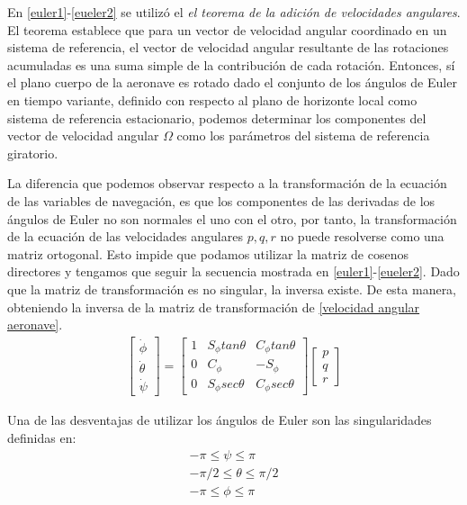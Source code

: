 En \ref{euler1}-\ref{eueler2} se utilizó el \textit{el teorema de la adición de velocidades angulares}. El teorema establece que para un vector de velocidad angular coordinado en un sistema de referencia, el vector de velocidad angular resultante de las rotaciones acumuladas es una suma simple de la contribución de cada rotación. Entonces, sí el plano cuerpo de la aeronave es rotado dado el conjunto de los ángulos de Euler en tiempo variante, definido con respecto al plano de horizonte local como sistema de referencia estacionario, podemos determinar los componentes del vector de velocidad angular $\Omega$ como los parámetros del sistema de referencia giratorio.

La diferencia que podemos observar respecto a la transformación de la ecuación de las variables de navegación, es que los componentes de las derivadas de los ángulos de Euler no son normales el uno con el otro, por tanto, la transformación de la ecuación de las velocidades angulares $p,q,r$ no puede resolverse como una matriz ortogonal. Esto impide que podamos utilizar la matriz de cosenos directores y tengamos que seguir la secuencia mostrada en \ref{euler1}-\ref{eueler2}.
Dado que la matriz de transformación es no singular, la inversa existe. De esta manera, obteniendo la inversa de la matriz de transformación de  \ref{velocidad angular aeronave}. 
\begin{gather}
    \begin{bmatrix}
    \dot \phi\\
    \dot \theta\\
    \dot \psi
    \end{bmatrix}
    =
    \begin{bmatrix}
    1 & S_{\phi} tan\theta & C_{\phi} tan\theta\\
    0 & C_{\phi} & -S_{\phi}\\
    0 & S_{\phi} sec\theta & C_{\phi} sec\theta
    \end{bmatrix}
    \begin{bmatrix}
    p\\
    q\\
    r
    \end{bmatrix}
\label{eq cinem rot}
\end{gather}

Una de las desventajas de utilizar los ángulos de Euler son las singularidades definidas en: 
\begin{gather}
    -\pi \leqslant \psi \leqslant \pi \\
    -\pi / 2 \leqslant \theta \leqslant \pi / 2 \\
    -\pi \leqslant \phi \leqslant \pi
\end{gather}

